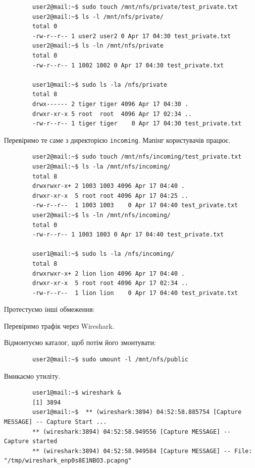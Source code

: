 \documentclass[14pt, a4paper]{extreport}
\begin{document}
	\begin{verbatim}
		user2@mail:~$ sudo touch /mnt/nfs/private/test_private.txt
		user2@mail:~$ ls -l /mnt/nfs/private/
		total 0
		-rw-r--r-- 1 user2 user2 0 Apr 17 04:30 test_private.txt
		user2@mail:~$ ls -ln /mnt/nfs/private
		total 0
		-rw-r--r-- 1 1002 1002 0 Apr 17 04:30 test_private.txt
		
		user1@mail:~$ sudo ls -la /nfs/private
		total 8
		drwx------ 2 tiger tiger 4096 Apr 17 04:30 .
		drwxr-xr-x 5 root  root  4096 Apr 17 02:34 ..
		-rw-r--r-- 1 tiger tiger    0 Apr 17 04:30 test_private.txt
	\end{verbatim}
	
	Перевіримо те саме з директорією \texttt{incoming}. Мапінг користувачів працює.
	
	\begin{verbatim}
		user2@mail:~$ sudo touch /mnt/nfs/incoming/test_private.txt
		user2@mail:~$ ls -la /mnt/nfs/incoming/
		total 8
		drwxrwxr-x+ 2 1003 1003 4096 Apr 17 04:40 .
		drwxr-xr-x  5 root root 4096 Apr 17 04:25 ..
		-rw-r--r--  1 1003 1003    0 Apr 17 04:40 test_private.txt
		user2@mail:~$ ls -ln /mnt/nfs/incoming/
		total 0
		-rw-r--r-- 1 1003 1003 0 Apr 17 04:40 test_private.txt
		
		user1@mail:~$ sudo ls -la /nfs/incoming/
		total 8
		drwxrwxr-x+ 2 lion lion 4096 Apr 17 04:40 .
		drwxr-xr-x  5 root root 4096 Apr 17 02:34 ..
		-rw-r--r--  1 lion lion    0 Apr 17 04:40 test_private.txt
	\end{verbatim}
	
	Протестуємо інші обмеження:
	
	
	Перевіримо трафік через Wireshark.
	
	Відмонтуємо каталог, щоб потім його змонтувати: \sideat{[VM 2]}
	
	\begin{verbatim}
		user2@mail:~$ sudo umount -l /mnt/nfs/public
	\end{verbatim}
	
	Вмикаємо утиліту. \sideat{[VM 1]}
	
	\begin{verbatim}
		user1@mail:~$ wireshark &
		[1] 3894
		user1@mail:~$  ** (wireshark:3894) 04:52:58.885754 [Capture MESSAGE] -- Capture Start ...
		** (wireshark:3894) 04:52:58.949556 [Capture MESSAGE] -- Capture started
		** (wireshark:3894) 04:52:58.949584 [Capture MESSAGE] -- File: "/tmp/wireshark_enp0s8E1NBO3.pcapng"
	\end{verbatim}
	
\end{document}
